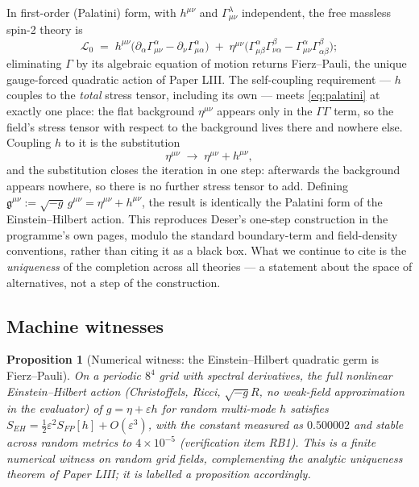\documentclass[12pt]{article}
\newtheorem{proposition}[theorem]{Proposition}
\theoremstyle{definition}
\theoremstyle{remark}
\begin{document}
In first-order (Palatini) form, with $h^{\mu\nu}$ and $\Gamma^\lambda_{\mu\nu}$ independent, the free massless spin-2 theory is
\begin{equation}
\mathcal L_0 \;=\; h^{\mu\nu}\bigl(\partial_\alpha\Gamma^\alpha_{\mu\nu} - \partial_\nu\Gamma^\alpha_{\mu\alpha}\bigr) \;+\; \eta^{\mu\nu}\bigl(\Gamma^\alpha_{\mu\beta}\Gamma^\beta_{\nu\alpha} - \Gamma^\alpha_{\mu\nu}\Gamma^\beta_{\alpha\beta}\bigr);
\label{eq:palatini}
\end{equation}
eliminating $\Gamma$ by its algebraic equation of motion returns Fierz--Pauli, the unique gauge-forced quadratic action of Paper LIII. The self-coupling requirement --- $h$ couples to the \emph{total} stress tensor, including its own --- meets \eqref{eq:palatini} at exactly one place: the flat background $\eta^{\mu\nu}$ appears only in the $\Gamma\Gamma$ term, so the field's stress tensor with respect to the background lives there and nowhere else. Coupling $h$ to it is the substitution
$$\eta^{\mu\nu} \;\longrightarrow\; \eta^{\mu\nu} + h^{\mu\nu},$$
and the substitution closes the iteration in one step: afterwards the background appears nowhere, so there is no further stress tensor to add. Defining $\mathfrak g^{\mu\nu} := \sqrt{-g}\,g^{\mu\nu} = \eta^{\mu\nu} + h^{\mu\nu}$, the result is identically the Palatini form of the Einstein--Hilbert action. This reproduces Deser's one-step construction \citep{Deser1970} in the programme's own pages, modulo the standard boundary-term and field-density conventions, rather than citing it as a black box. What we continue to cite is the \emph{uniqueness} of the completion across all theories \citep{Wald1986} --- a statement about the space of alternatives, not a step of the construction.

\subsection{Machine witnesses}

\begin{proposition}[Numerical witness: the Einstein--Hilbert quadratic germ is Fierz--Pauli]\label{prop:rb1}
On a periodic $8^4$ grid with spectral derivatives, the full nonlinear Einstein--Hilbert action (Christoffels, Ricci, $\sqrt{-g}R$, no weak-field approximation in the evaluator) of $g = \eta + \varepsilon h$ for random multi-mode $h$ satisfies $S_{EH} = \tfrac12\varepsilon^2 S_{FP}[h] + O(\varepsilon^3)$, with the constant measured as $0.500002$ and stable across random metrics to $4\times10^{-5}$ (verification item RB1). This is a finite numerical witness on random grid fields, complementing the analytic uniqueness theorem of Paper LIII; it is labelled a proposition accordingly.
\end{proposition}
\end{document}
